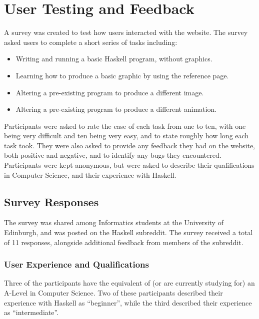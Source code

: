\documentclass[../main.tex]{subfiles}
\begin{document}
    \section{User Testing and Feedback}
        A survey was created to test how users interacted with the website.
        The survey asked users to complete a short series of tasks including:
        \begin{itemize}
            \item Writing and running a basic Haskell program, without graphics.
            \item Learning how to produce a basic graphic by using the reference page.
            \item Altering a pre-existing program to produce a different image.
            \item Altering a pre-existing program to produce a different animation.
        \end{itemize}

        Participants were asked to rate the ease of each task from one to ten, with one
            being very difficult and ten being very easy, and to state roughly how long
            each task took.
        They were also asked to provide any feedback they had on the website, both
            positive and negative, and to identify any bugs they encountered.
        Participants were kept anonymous, but were asked to describe their
            qualifications in Computer Science, and their experience with Haskell.

        \subsection{Survey Responses}
            The survey was shared among Informatics students at the University of
                Edinburgh, and was posted on the Haskell subreddit.
            The survey received a total of 11 responses, alongside additional feedback from
                members of the subreddit.

            \subsubsection{User Experience and Qualifications}
                Three of the participants have the equivalent of (or are currently studying
                    for) an A-Level in Computer Science.
                Two of these participants described their experience with Haskell as
                    ``beginner'', while the third described their experience as ``intermediate''.
\end{document}
